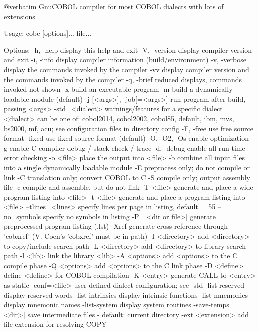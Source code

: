 @verbatim
GnuCOBOL compiler for most COBOL dialects with lots of extensions

Usage: cobc [options]... file...

Options:
  -h, -help             display this help and exit
  -V, -version          display compiler version and exit
  -i, -info             display compiler information (build/environment)
  -v, -verbose          display the commands invoked by the compiler
  -vv                   display compiler version and the commands
                        invoked by the compiler
  -q, -brief            reduced displays, commands invoked not shown
  -x                    build an executable program
  -m                    build a dynamically loadable module (default)
  -j [<args>], -job[=<args>]	run program after build, passing <args>
  -std=<dialect>        warnings/features for a specific dialect
                        <dialect> can be one of:
                        cobol2014, cobol2002, cobol85, default,
                        ibm, mvs, bs2000, mf, acu;
                        see configuration files in directory config
  -F, -free             use free source format
  -fixed                use fixed source format (default)
  -O, -O2, -Os          enable optimization
  -g                    enable C compiler debug / stack check / trace
  -d, -debug            enable all run-time error checking
  -o <file>             place the output into <file>
  -b                    combine all input files into a single
                        dynamically loadable module
  -E                    preprocess only; do not compile or link
  -C                    translation only; convert COBOL to C
  -S                    compile only; output assembly file
  -c                    compile and assemble, but do not link
  -T <file>             generate and place a wide program listing into <file>
  -t <file>             generate and place a program listing into <file>
  --tlines=<lines>      specify lines per page in listing, default = 55
  --no_symbols          specify no symbols in listing
  -P[=<dir or file>]    generate preprocessed program listing (.lst)
  -Xref                 generate cross reference through 'cobxref'
                        (V. Coen's 'cobxref' must be in path)
  -I <directory>        add <directory> to copy/include search path
  -L <directory>        add <directory> to library search path
  -l <lib>              link the library <lib>
  -A <options>          add <options> to the C compile phase
  -Q <options>          add <options> to the C link phase
  -D <define>           define <define> for COBOL compilation
  -K <entry>            generate CALL to <entry> as static
  -conf=<file>          user-defined dialect configuration; see -std
  -list-reserved        display reserved words
  -list-intrinsics      display intrinsic functions
  -list-mnemonics       display mnemonic names
  -list-system          display system routines
  -save-temps[=<dir>]   save intermediate files
                        - default: current directory
  -ext <extension>      add file extension for resolving COPY

